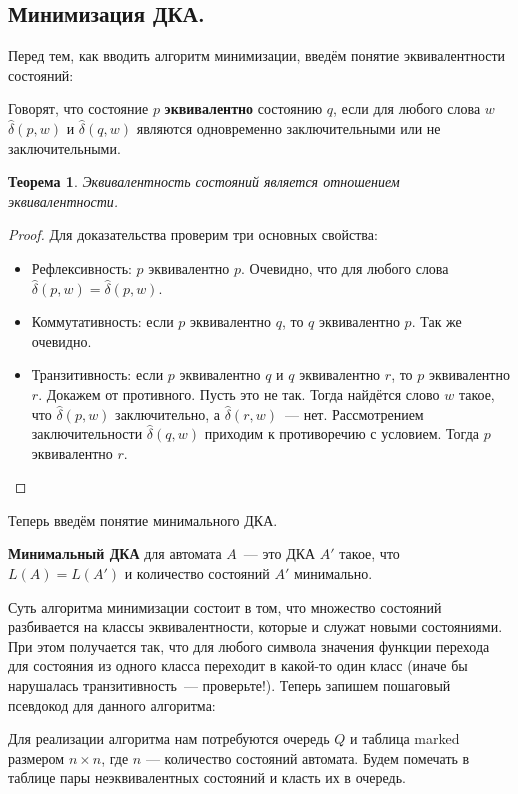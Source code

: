 \documentclass[a4paper,12pt]{article}
\newtheorem*{theorem}{Теорема}
\begin{document}
	 \subsection{Минимизация ДКА.}
	Перед тем, как вводить алгоритм минимизации, введём понятие эквивалентности состояний:
	
	Говорят, что состояние \(p\) \textbf{эквивалентно} состоянию \(q\), если для любого слова \(w\) \(\hat{\delta}(p, w)\) и \(\hat{\delta}(q, w)\) являются одновременно заключительными или не заключительными. 
	
	\begin{theorem}
		Эквивалентность состояний является отношением эквивалентности.
	\end{theorem}
	\begin{proof}
	 	Для доказательства проверим три основных свойства: 
	 	\begin{itemize}
	 		\item Рефлексивность: \(p\) эквивалентно \(p\). Очевидно, что для любого слова \(\hat{\delta}(p, w) = \hat{\delta}(p, w)\).
	 		\item Коммутативность: если \(p\) эквивалентно \(q\), то \(q\) эквивалентно \(p\). Так же очевидно.
	 		\item Транзитивность: если \(p\) эквивалентно \(q\) и \(q\) эквивалентно \(r\), то \(p\) эквивалентно \(r\). Докажем от противного. Пусть это не так. Тогда найдётся слово \(w\) такое, что \(\hat{\delta}(p, w)\) заключительно, а \(\hat{\delta}(r, w)\)~--- нет. Рассмотрением заключительности \(\hat{\delta}(q, w)\) приходим к противоречию с условием. Тогда \(p\) эквивалентно \(r\). 
	 	\end{itemize}
	\end{proof}
	
	Теперь введём понятие минимального ДКА.
	
	\textbf{Минимальный ДКА} для автомата \(A\)~--- это ДКА \(A'\) такое, что \(L(A) = L(A')\) и количество состояний \(A'\) минимально.
	
	Суть алгоритма минимизации состоит в том, что множество состояний разбивается на классы эквивалентности, которые и служат новыми состояниями. При этом получается так, что для любого символа значения функции перехода для состояния из одного класса переходит в какой-то один класс (иначе бы нарушалась транзитивность~--- проверьте!). Теперь запишем пошаговый псевдокод для данного алгоритма:
	
	Для реализации алгоритма нам потребуются очередь \(Q\) и таблица marked размером \(n \times n\), где \(n\) — количество состояний автомата. Будем помечать в таблице пары неэквивалентных состояний и класть их в очередь.
	
\end{document}
